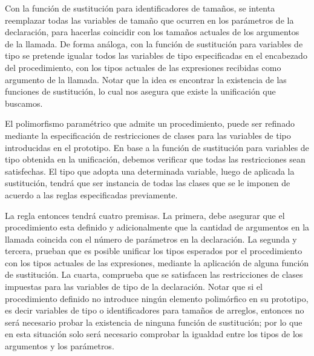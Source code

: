 Con la función de sustitución para identificadores de tamaños, se intenta reemplazar todas las variables de tamaño que ocurren en los parámetros de la declaración, para hacerlas coincidir con los tamaños actuales de los argumentos de la llamada.
De forma análoga, con la función de sustitución para variables de tipo se pretende igualar todos las variables de tipo especificadas en el encabezado del procedimiento, con los tipos actuales de las expresiones recibidas como argumento de la llamada.
Notar que la idea es encontrar la existencia de las funciones de sustitución, lo cual nos asegura que existe la unificación que buscamos.

El polimorfismo paramétrico que admite un procedimiento, puede ser refinado mediante la especificación de restricciones de clases para las variables de tipo introducidas en el prototipo.
En base a la función de sustitución para variables de tipo obtenida en la unificación, debemos verificar que todas las restricciones sean satisfechas.
El tipo que adopta una determinada variable, luego de aplicada la sustitución, tendrá que ser instancia de todas las clases que se le imponen de acuerdo a las reglas especificadas previamente.

\newpage

La regla entonces tendrá cuatro premisas.
La primera, debe asegurar que el procedimiento esta definido y adicionalmente que la cantidad de argumentos en la llamada coincida con el número de parámetros en la declaración.
La segunda y tercera, prueban que es posible unificar los tipos esperados por el procedimiento con los tipos actuales de las expresiones, mediante la aplicación de alguna función de sustitución.
La cuarta, comprueba que se satisfacen las restricciones de clases impuestas para las variables de tipo de la declaración.
Notar que si el procedimiento definido no introduce ningún elemento polimórfico en su prototipo, es decir variables de tipo o identificadores para tamaños de arreglos, entonces no será necesario probar la existencia de ninguna función de sustitución; por lo que en esta situación solo será necesario comprobar la igualdad entre los tipos de los argumentos y los parámetros.

